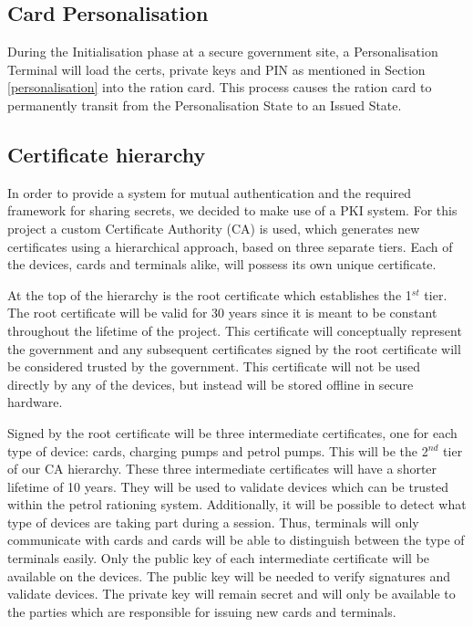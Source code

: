 \documentclass[a4paper,10pt]{llncs}
\begin{document}
\subsection{Card Personalisation}
\label{Design:Personalisation}
During the Initialisation phase at a secure government site, a Personalisation Terminal will load the certs, private keys and PIN as mentioned in Section \ref{personalisation} into the ration card. This process causes the ration card to permanently transit from the Personalisation State to an Issued State.

\subsection{Certificate hierarchy}
In order to provide a system for mutual authentication and the required framework for sharing secrets, we decided to make use of a PKI system. For this project a custom Certificate Authority (CA) is used, which generates new certificates using a hierarchical approach, based on three separate tiers. Each of the devices, cards and terminals alike, will possess its own unique certificate.

At the top of the hierarchy is the root certificate which establishes the 1$^{st}$ tier. The root certificate will be valid for 30 years since it is meant to be constant throughout the lifetime of the project. This certificate will conceptually represent the government and any subsequent certificates signed by the root certificate will be considered trusted by the government. This certificate will not be used directly by any of the devices, but instead will be stored offline in secure hardware.

Signed by the root certificate will be three intermediate certificates, one for each type of device: cards, charging pumps and petrol pumps. This will be the 2$^{nd}$ tier of our CA hierarchy. These three intermediate certificates will have a shorter lifetime of 10 years. They will be used to validate devices which can be trusted within the petrol rationing system. Additionally, it will be possible to detect what type of devices are taking part during a session. Thus, terminals will only communicate with cards and cards will be able to distinguish between the type of terminals easily. Only the public key of each intermediate certificate will be available on the devices. The public key will be needed to verify signatures and validate devices. The private key will remain secret and will only be available to the parties which are responsible for issuing new cards and terminals.
\end{document}
